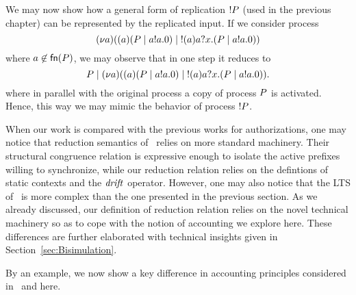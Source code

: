 We may now show how a general form of replication $! P$ (used in the previous chapter) can be represented by the replicated input. If we consider process
\[
(\nu a)((a)(P \;|\; a!a.0) \;|\; !(a)a?x.(P \;|\; a!a.0))
\]
where $a\not\in\mathsf{fn}(P)$, we may observe that in  %
 one step it reduces to 
\[
P \;|\; (\nu a)((a)(P \;|\; a!a.0) \;|\; !(a)a?x.(P \;|\; a!a.0)).
\]
where in parallel with the original process a copy of process $P$ is activated. Hence, this way we may mimic the behavior of process $! P$.


When our work is compared with the previous works for authorizations, one may notice that reduction semantics of~\cite{clar:eke} relies on more standard machinery. Their structural congruence relation is expressive enough to isolate the active prefixes willing to synchronize, while our reduction relation relies on the defintions of static contexts and the $\mathit {drift}$ operator. However, one may also notice that the LTS of~\cite{clar:eke} is more complex than the one presented in the previous section. As we already discussed, our definition of reduction relation relies on the novel technical machinery so as to cope with the notion of accounting we explore here. These differences are further elaborated with technical insights given in Section~\ref{sec:Bisimulation}. %


By an example, we now show a key difference in accounting principles considered in~\cite{clar:eke} and here.

